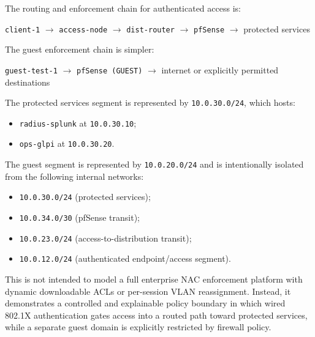 \documentclass[11pt]{article}
\begin{document}
The routing and enforcement chain for authenticated access is:

\begin{center}
\texttt{client-1} $\rightarrow$ \texttt{access-node} $\rightarrow$ \texttt{dist-router} $\rightarrow$ \texttt{pfSense} $\rightarrow$ protected services
\end{center}

The guest enforcement chain is simpler:

\begin{center}
\texttt{guest-test-1} $\rightarrow$ \texttt{pfSense (GUEST)} $\rightarrow$ internet or explicitly permitted destinations
\end{center}

The protected services segment is represented by \texttt{10.0.30.0/24}, which hosts:

\begin{itemize}
    \item \texttt{radius-splunk} at \texttt{10.0.30.10};
    \item \texttt{ops-glpi} at \texttt{10.0.30.20}.
\end{itemize}

The guest segment is represented by \texttt{10.0.20.0/24} and is intentionally isolated from the following internal networks:

\begin{itemize}
    \item \texttt{10.0.30.0/24} (protected services);
    \item \texttt{10.0.34.0/30} (pfSense transit);
    \item \texttt{10.0.23.0/24} (access-to-distribution transit);
    \item \texttt{10.0.12.0/24} (authenticated endpoint/access segment).
\end{itemize}

This is not intended to model a full enterprise NAC enforcement platform with dynamic downloadable ACLs or per-session VLAN reassignment. Instead, it demonstrates a controlled and explainable policy boundary in which wired 802.1X authentication gates access into a routed path toward protected services, while a separate guest domain is explicitly restricted by firewall policy.

\end{document}
